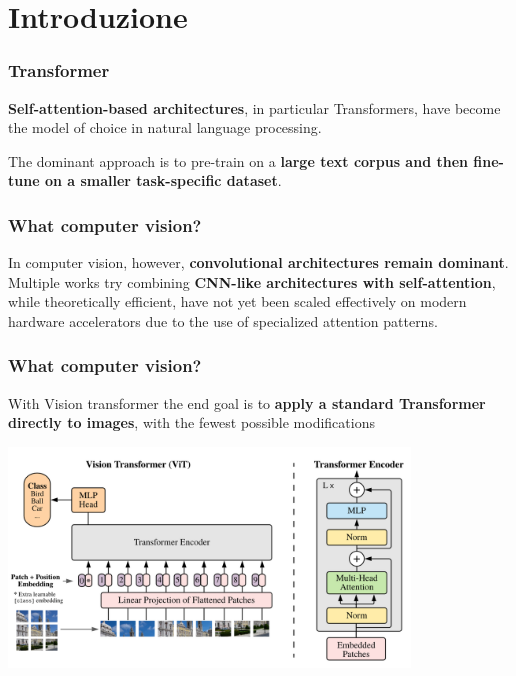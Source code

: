 
\section{Introduzione} %


\begin{frame}
\frametitle{Transformer}
\textbf{Self-attention-based architectures}, in particular Transformers, have become the model of choice in natural language processing.
\vspace{0.5cm}

The dominant approach is to pre-train on a \textbf{large text corpus and then fine-tune on a smaller task-specific dataset}.

\end{frame}

\begin{frame}
\frametitle{What computer vision?}
In computer vision, however, \textbf{convolutional architectures remain dominant}.
Multiple works try combining \textbf{CNN-like architectures with self-attention}, while theoretically efficient, have not yet been scaled effectively on modern hardware accelerators due to the use of specialized attention patterns. 
\end{frame}

\begin{frame}
\frametitle{What computer vision?}
With Vision transformer the end goal is to \textbf{apply a standard Transformer directly to images}, with the fewest possible modifications
\begin{center}
    \includegraphics[width=0.8\textwidth]{img/1-section/Vision transformer.png} 
\end{center}

\end{frame}